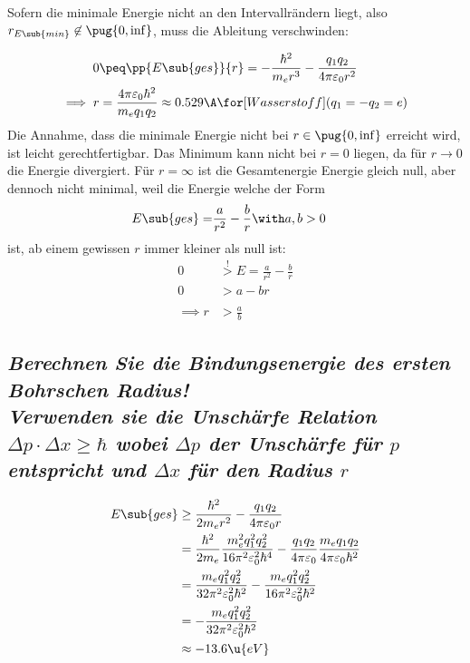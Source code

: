 \documentclass[ex, minted]{exercise_4.0}
\begin{document}
Sofern die minimale Energie nicht an den Intervallrändern liegt, also 
$r_{E\sub{min}}\not\in\pug{0,\inf}$, muss die Ableitung verschwinden:

\begin{align*}
    0 &\peq \pp{E\sub{ges}}{r}
    = -\frac{\hbar^2}{m_e r^3} - \frac{q_1 q_2}{4\pi \varepsilon_0 r^2}\\
    \implies r  &= \frac{4\pi \varepsilon_0 \hbar^2}{m_e q_1 q_2 }
    \approx  0.529 \A \for[Wasserstoff ] (q_1=-q_2=e)
\end{align*}
Die Annahme, dass die minimale Energie nicht bei $r\in\pug{0,\inf}$ erreicht wird, ist leicht gerechtfertigbar. Das Minimum kann nicht bei $r=0$ liegen, da für $r\to 0$ die Energie divergiert. Für $r=\infty$ ist die Gesamtenergie Energie gleich null, aber dennoch nicht minimal, weil die Energie welche der Form
\begin{align*}
    E\sub{ges}=&\frac{a}{r^2} - \frac{b}{r}\with a,b>0
\end{align*}
ist, ab einem gewissen $r$ immer kleiner als null ist:
\begin{align*}
    0 &\overset!> E = \frac{a}{r^2} - \frac{b}{r}\\
    0 &> a - b r\\
    \\
    \implies r &> \frac ab
\end{align*}  

\subsection{\it Berechnen Sie die Bindungsenergie des ersten Bohrschen Radius!\\
{} Verwenden sie die Unschärfe Relation $\Delta p \cdot \Delta x \ge \hbar $ wobei $\Delta p$ der Unschärfe für $p$
entspricht und $\Delta x$ für den Radius $r$}\vspace{1ex}

\begin{align*}
    E\sub{ges} &\ge \frac{\hbar^2}{2m_e r^2} - \frac{q_1 q_2}{4\pi \varepsilon_0 r}\\
    &= \frac{\hbar^2}{2m_e}\frac{m_e^2 q_1^2 q_2^2 }{16\pi^2 \varepsilon_0^2 \hbar^4} - \frac{q_1 q_2}{4\pi \varepsilon_0}\frac{m_e q_1 q_2 }{4\pi \varepsilon_0 \hbar^2}\\
    &= \frac{m_e q_1^2 q_2^2 }{32\pi^2 \varepsilon_0^2 \hbar^2} - \frac{m_e q_1^2 q_2^2 }{16\pi^2 \varepsilon_0^2 \hbar^2}\\
    &= -\frac{m_e q_1^2 q_2^2 }{32\pi^2 \varepsilon_0^2 \hbar^2} \\
    &\approx -13.6\u{eV}
\end{align*}
\end{document}
